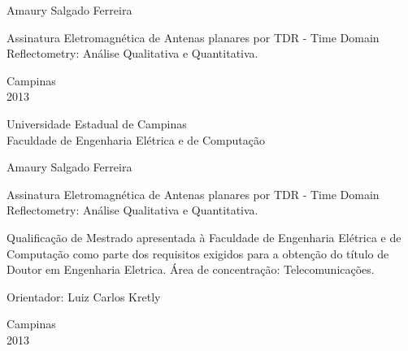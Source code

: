 \vspace*{2.0cm}
\begin{center}
\large Amaury Salgado Ferreira
\end{center}


\vspace*{6.8cm}

\begin{center}
{\sc \Large  Assinatura Eletromagnética de Antenas planares por TDR - Time Domain Reflectometry: Análise Qualitativa e Quantitativa.}
\end{center}

\vspace*{3.25cm}


\null \vfill

\begin{center}
Campinas\\2013
\end{center}
\newpage

\begin{center}
\large Universidade Estadual de Campinas\\
Faculdade de Engenharia Elétrica e de Computação
\end{center}

\vspace*{1.5cm}
\begin{center}
\large Amaury Salgado Ferreira
\end{center}


\vspace*{2.3cm}

\begin{center}
{\sc  Assinatura Eletromagnética de Antenas planares por TDR - Time Domain Reflectometry: Análise Qualitativa e Quantitativa.}
\end{center}

\vspace*{3.0cm}

\begin{flushright}
\begin{minipage}{9.0cm}
Qualificação de Mestrado apresentada à Faculdade de Engenharia Elétrica e de Computação como  parte dos
requisitos exigidos para a obtenção do título de Doutor em Engenharia Eletrica. Área de
concentração: Telecomunicações. 

\vspace*{0.5cm}
Orientador: Luiz Carlos Kretly

\end{minipage}
\end{flushright}

\null \vfill


\vspace*{0.5cm}

\begin{center}
Campinas\\2013
\end{center}
